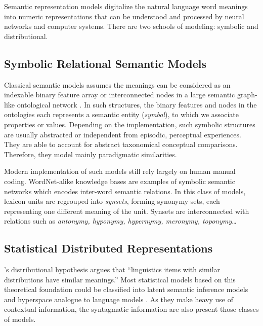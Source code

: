 Semantic representation models digitalize the natural language word meanings into numeric representations that can be understood and processed by neural networks and computer systems. There are two schools of modeling: symbolic and distributional.

\subsection{Symbolic Relational Semantic Models}

\label{subsection:symbolicembedding}
Classical semantic models assumes the meanings can be considered as an indexable binary feature array \parencite{smithSemanticMemoryPsychological1974} or interconnected nodes in a large semantic graph-like ontological network \parencite{collinsRetrievalTimeSemantic1969}. In such structures, the binary features and nodes in the ontologies each represents a semantic entity (\emph{symbol}), to which we associate properties or values. Depending on the implementation, such symbolic structures are usually abstracted or independent from episodic, perceptual experiences. They are able to account for abstract taxonomical conceptual comparisons. Therefore, they model mainly paradigmatic similarities. 

Modern implementation of such models still rely largely on human manual coding. WordNet-alike knowledge bases \parencite{millerWordNetLexicalDatabase1995, millerWordNetElectronicLexical1998, sagotBuildingFreeFrench2008, pradetWonefImprovedExpanded2014} are examples of symbolic semantic networks which encodes inter-word semantic relations. In this class of models, lexicon units are regrouped into \emph{synsets}, forming synonymy sets, each representing one different meaning of the unit. Synsets are interconnected with relations such as \emph{antonymy, hyponymy, hypernymy, meronymy, toponymy}\dots

\subsection{Statistical Distributed Representations}

\label{subsection:statisticalembedding}

\textcite{harrisDistributionalStructure1954}'s distributional hypothesis argues that ``linguistics items with similar distributions have similar meanings.'' Most statistical models based on this theoretical foundation could be classified into latent semantic inference models \parencite{deerwesterUnitedStatesPatent1989, penningtonGloveGlobalVectors2014} and hyperspace analogue to language models \parencite{burgessHyperspaceAnalogueLanguage1995, mikolovEfficientEstimationWord2013, levyDependencyBasedWordEmbeddings2014}. As they make heavy use of contextual information, the syntagmatic information are also present those classes of models.

